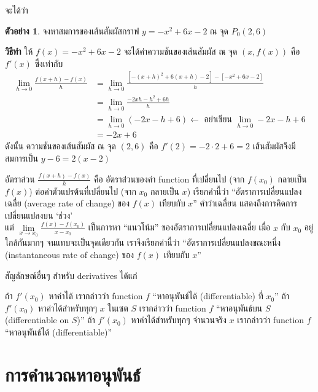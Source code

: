 \documentclass[
]{book}
\theoremstyle{definition}
\theoremstyle{definition}
\newtheorem{example}{ตัวอย่าง}[chapter]
\theoremstyle{definition}
\theoremstyle{definition}
\theoremstyle{remark}
\begin{document}
จะได้ว่า

\begin{example}
จงหาสมการของเส้นสัมผัสกราฟ \(y = -x^2 + 6x -2\) ณ จุด \(P_0(2,6)\)
\end{example}

\textbf{วิธีทำ} ให้ \(f(x) = -x^2 + 6x -2\) จะได้ค่าความชันของเส้นสัมผัส ณ จุด \((x,f(x))\)
คือ \(f'(x)\) ซึ่งเท่ากับ \begin{equation}   \begin{aligned}
    \underset{h \rightarrow 0}{\lim}\frac{f(x+h) - f(x)}{h}
        &= \underset{h \rightarrow 0}{\lim}\frac{\left[-(x+h)^2 + 6(x+h)-2 \right]-
        \left[ -x^2 + 6x -2 \right] }{h} \\
        &=\underset{h \rightarrow 0}{\lim}\frac{-2xh-h^2+6h}{h} \\
        &=\underset{h \rightarrow 0}{\lim}(-2x-h+6)
        \leftarrow \boxed{\mbox{ อย่าเขียน $\underset{h \rightarrow 0}{\lim}-2x-h+6$}}\\
        &=-2x+6
  \end{aligned} \end{equation} ดังนั้น ความชันของเส้นสัมผัส ณ จุด \((2,6)\) คือ
\(f'(2) = -2 \cdot 2 + 6 =2\) เส้นสัมผัสจึงมีสมการเป็น \(y - 6 = 2(x-2)\)

อัตราส่วน \(\displaystyle\frac{f(x+h) - f(x)}{h}\) คือ อัตราส่วนของค่า function
ที่เปลี่ยนไป (จาก \(f(x_0)\) กลายเป็น \(f(x)\)) ต่อค่าตัวแปรต้นที่เปลี่ยนไป (จาก \(x_0\)
กลายเป็น \(x\)) เรียกคำนี้ว่า ``อัตราการเปลี่ยนแปลงเฉลี่ย (average rate of change)
ของ \(f(x)\) เทียบกับ \(x\)'' คำว่าเฉลี่ยน แสดงถึงการคิดการเปลี่ยนแปลงบน `ช่วง'\\
แต่
\(\displaystyle\underset{x \rightarrow x_0}{\lim}\frac{f(x) - f(x_0)}{x-x_0}\)
เป็นการหา ``แนวโน้ม'' ของอัตราการเปลี่ยนแปลงเฉลี่ย เมื่อ \(x\) กับ \(x_0\) อยู่ใกล้กันมากๆ
จนแทบจะเป็นจุดเดียวกัน เราจึงเรียกค่านี้ว่า ``อัตราการเปลี่ยนแปลงขณะหนึ่ง (instantaneous
rate of change) ของ \(f(x)\) เทียบกับ \(x\)''

สัญลักษณ์อื่นๆ สำหรับ derivatives ได้แก่

ถ้า \(f'(x_0)\) หาค่าได้ เรากล่าวว่า function \(f\) ``หาอนุพันธ์ได้ (differentiable) ที่
\(x_0\)'' ถ้า \(f'(x_0)\) หาค่าได้สำหรับทุกๆ \(x\) ในเซต \(S\) เรากล่าวว่า function \(f\)
``หาอนุพันธ์บน \(S\) (differentiable on \(S\))'' ถ้า \(f'(x_0)\) หาค่าได้สำหรับทุกๆ
จำนวนจริง \(x\) เรากล่าวว่า function \(f\) ``หาอนุพันธ์ได้ (differentiable)''

\section{การคำนวณหาอนุพันธ์}\label{uxe01uxe32uxe23uxe04uxe33uxe19uxe27uxe13uxe2buxe32uxe2duxe19uxe1euxe19uxe18}
\end{document}
